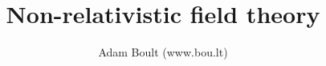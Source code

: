 \documentclass[oneside]{book}
\begin{document}
\author{Adam Boult (www.bou.lt)}
\title{Non-relativistic field theory}
\maketitle

\setcounter{tocdepth}{0}
\tableofcontents


\end{document}
